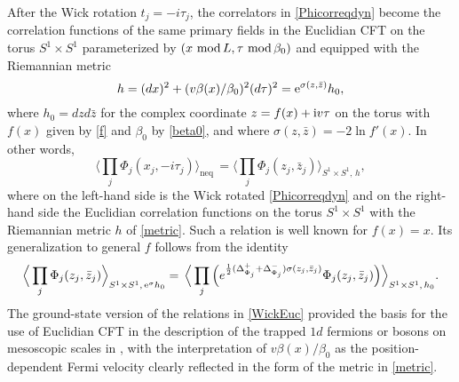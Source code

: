 \documentclass[12pt,a4paper]{article}
\newcommand{\ee}{{\rm e}}
\newcommand{\ii}{{\rm i}}
\theoremstyle{definition}
\theoremstyle{remark}
\begin{document}
After the Wick rotation $t_j=-i\tau_j$, the correlators in \eqref{Phicorreqdyn}
become the correlation functions of the same primary fields in the Euclidian
CFT on the torus $S^1\times S^1$ parameterized by $(x\ {\rm mod}\,L,\tau
\ {\rm mod}\,\beta_0)$ and equipped with the Riemannian metric
\begin{equation}
h=(dx)^2+(v\beta(x)/\beta_0)^2(d\tau)^2=\ee^{\sigma(z,\bar z)}h_0,
\label{metric}
\end{equation}
where $h_0=dzd\bar z$ for the complex coordinate $z=f(x)+\ii v\tau$
on the torus with $f(x)$ given by \eqref{f} and $\beta_0$ by \eqref{beta0},
and where $\sigma(z,\bar z)=-2\ln{f'(x)}$. In other words,
\begin{equation}
\Big\langle \prod_{j}\Phi_j(x_j,-i\tau_j)\Big\rangle_{\text{neq}}\,=\Big\langle
\prod_j\Phi_j(z_j,\bar z_j)\Big\rangle_{S^1\times S^1,\,h},
\label{WickEuc}
\end{equation}
where on the left-hand side is the Wick rotated \eqref{Phicorreqdyn}
and on the right-hand side the Euclidian correlation functions on
the torus $S^1\times S^1$ with the Riemannian metric $h$ of
\eqref{metric}. Such a relation is well known for $f(x)=x$. 
Its generalization to general $f$ follows from the identity
\begin{equation}
\Big\langle\prod_j\Phi_j(z_j,\bar z_j)\Big\rangle_{S^1\times S^1,\,\ee^\sigma h_0}
=\,\Big\langle
\prod_j\Big(e^{\frac{1}{2}(\Delta^+_{\Phi_j}+\Delta^-_{\Phi_j})
\sigma(z_j,\bar z_j)}\Phi_j(z_j,\bar z_j)\Big)\Big\rangle_{S^1\times S^1,\,h_0}.
\end{equation}
The ground-state version of the relations in \eqref{WickEuc} 
provided the basis for the use of Euclidian CFT in the description
of the trapped $1d$ fermions or bosons on mesoscopic scales
in \cite{DSVC,BD1,DSC,BD2}, with the interpretation of
$v\beta(x)/\beta_0$ as the position-dependent Fermi velocity clearly
reflected in the form of the metric in \eqref{metric}.
\vskip 0.1cm
\end{document}
